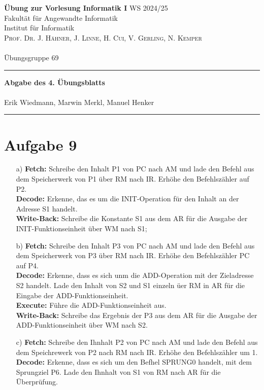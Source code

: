\documentclass[paper=a4, %
         fontsize=10pt,  %
         oneside,        %
         headsepline,    %
         notitlepage     %
]{scrartcl}              %
\newcommand{\ownline}{\vspace{.7em}\hrule\vspace{.7em}}
\newcommand{\aufgabe}[1]{\section*{Aufgabe #1}}
\begin{document}
\textbf{Übung zur Vorlesung Informatik I} \hfill{WS 2024/25} \\  
Fakultät für Angewandte Informatik \\
Institut für Informatik \\
\textsc{Prof. Dr. J. Hähner, J. Linne, H. Cui, V. Gerling, N. Kemper} \\
\mbox{} \\
{\large Übungsgruppe 69} %
\ownline
\begin{center}
	{\LARGE \textbf{Abgabe des 4. Übungsblatts}} \\ %
	\mbox{} \\
	{\large Erik Wiedmann, Marwin Merkl, Manuel Henker} \\ %
\end{center}
\ownline



\aufgabe{9}
\begin{enumerate}
	\item[a)]
		\textbf{Fetch:} Schreibe den Inhalt P1 von PC nach AM
        und lade den Befehl aus dem Speicherwerk von P1 über RM nach IR.
        Erhöhe den Befehlszähler auf P2.\\
        \textbf{Decode:} Erkenne, das es um die INIT-Operation für den Inhalt an der Adresse S1 handelt.\\
        \textbf{Write-Back:} Schreibe die Konstante S1 aus dem AR für die Ausgabe der INIT-Funktionseinheit über WM nach S1;
	\item[b)]
        \textbf{Fetch:} Schreibe den Inhalt P3 von PC nach AM
        und lade den Befehl aus dem Speicherwerk von P3 über RM nach IR. Erhöhe den Befehlszähler PC auf P4.\\
        \textbf{Decode:} Erkenne, dass es sich unm die ADD-Operation mit der Zieladresse S2 handelt.
        Lade den Inhalt von S2 und S1 einzeln üer RM in AR für die Eingabe der ADD-Funktionseinheit.\\
        \textbf{Execute:} Führe die ADD-Funktionseinheit aus.\\
        \textbf{Write-Back:} Schreibe das Ergebnis der P3 aus dem AR für die Ausgabe der ADD-Funktionseinheit über WM nach S2.
	\item[c)]
        \textbf{Fetch:} Schreibe den Ihnhalt P2 von PC nach AM
		und lade den Befehl aus dem Speichrewerk von P2 nach RM nach IR.
		Erhöhe den Befehlszähler um 1.
		\textbf{Decode:} Erkenne, dass es sich um den Befhel SPRUNG0 handelt,
		mit dem Sprungziel P6.
		Lade den Ihnhalt von S1 von RM nach AR für die Überprüfung.
\end{enumerate}

\end{document}
